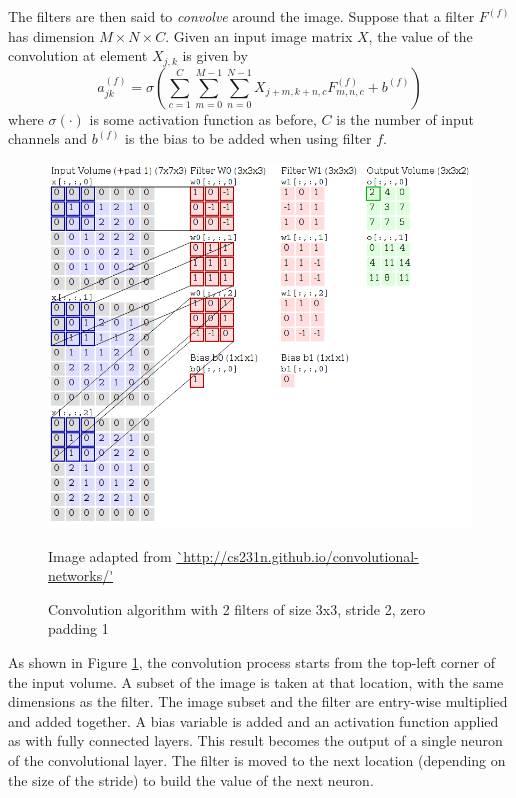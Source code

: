 The filters are then said to \textit{convolve} around the image. Suppose that a filter $F^{(f)}$ has dimension $M\times N \times C$. Given an input image matrix $X$, the value of the convolution at element $X_{j,k}$ is given by
\[
	a_{jk}^{(f)} = \sigma\left(\sum_{c=1}^C\sum_{m=0}^{M-1}\sum_{n=0}^{N-1}X_{j+m, k+n, c}F_{m,n,c}^{(f)}  + b^{(f)}\right)
\]
where $\sigma(\cdot)$ is some activation function as before, $C$ is the number of input channels and $b^{(f)}$ is the bias to be added when using filter $f$. 

\begin{figure}[ht]
	\centering
	\includegraphics[scale=0.5]{Images/4_convolution.png}
	\caption{Convolution algorithm with 2 filters of size 3x3, stride 2, zero padding 1}
	\small Image adapted from \url{`http://cs231n.github.io/convolutional-networks/'}
	\label{convnets-conv-alg}
\end{figure}

As shown in Figure \ref{convnets-conv-alg}, the convolution process starts from the top-left corner of the input volume. A subset of the image is taken at that location, with the same dimensions as the filter. The image subset and the filter are entry-wise multiplied and added together. A bias variable is added and an activation function applied as with fully connected layers. This result becomes the output of a single neuron of the convolutional layer. The filter is moved to the next location (depending on the size of the stride) to build the value of the next neuron.

